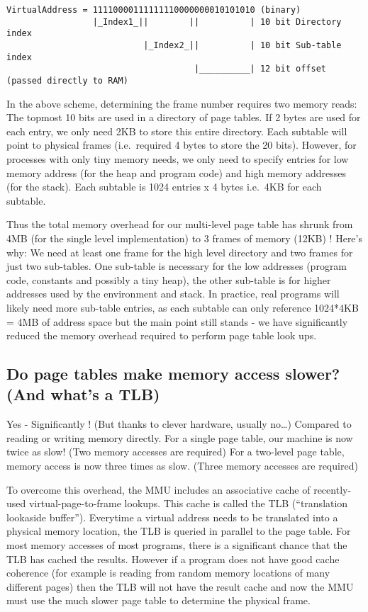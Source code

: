 \begin{verbatim}
VirtualAddress = 11110000111111110000000010101010 (binary)
                 |_Index1_||        ||          | 10 bit Directory index
                           |_Index2_||          | 10 bit Sub-table index
                                     |__________| 12 bit offset (passed directly to RAM)
\end{verbatim}

In the above scheme, determining the frame number requires two memory
reads: The topmost 10 bits are used in a directory of page tables. If 2
bytes are used for each entry, we only need 2KB to store this entire
directory. Each subtable will point to physical frames (i.e.~required 4
bytes to store the 20 bits). However, for processes with only tiny
memory needs, we only need to specify entries for low memory address
(for the heap and program code) and high memory addresses (for the
stack). Each subtable is 1024 entries x 4 bytes i.e.~4KB for each
subtable.

Thus the total memory overhead for our multi-level page table has shrunk
from 4MB (for the single level implementation) to 3 frames of memory
(12KB) ! Here's why: We need at least one frame for the high level
directory and two frames for just two sub-tables. One sub-table is
necessary for the low addresses (program code, constants and possibly a
tiny heap), the other sub-table is for higher addresses used by the
environment and stack. In practice, real programs will likely need more
sub-table entries, as each subtable can only reference 1024*4KB = 4MB of
address space but the main point still stands - we have significantly
reduced the memory overhead required to perform page table look ups.

\subsection{Do page tables make memory access slower? (And what's a
TLB)}\label{do-page-tables-make-memory-access-slower-and-whats-a-tlb}

Yes - Significantly ! (But thanks to clever hardware, usually
no\ldots{}) Compared to reading or writing memory directly. For a single
page table, our machine is now twice as slow! (Two memory accesses are
required) For a two-level page table, memory access is now three times
as slow. (Three memory accesses are required)

To overcome this overhead, the MMU includes an associative cache of
recently-used virtual-page-to-frame lookups. This cache is called the
TLB (``translation lookaside buffer''). Everytime a virtual address
needs to be translated into a physical memory location, the TLB is
queried in parallel to the page table. For most memory accesses of most
programs, there is a significant chance that the TLB has cached the
results. However if a program does not have good cache coherence (for
example is reading from random memory locations of many different pages)
then the TLB will not have the result cache and now the MMU must use the
much slower page table to determine the physical frame.

